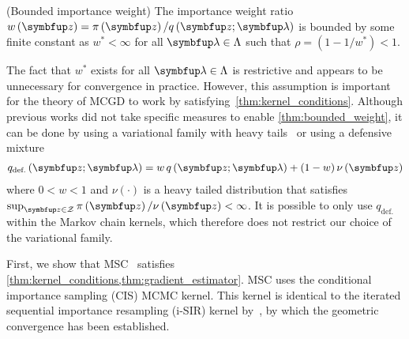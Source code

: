 \begin{assumption}{(Bounded importance weight)}\label{thm:bounded_weight}
  The importance weight ratio \(w\left(\vz\right) = \pi\left(\vz\right) / q\left(\vz; \vlambda\right)\) is bounded by some finite constant as \(w^* < \infty\) for all \(\vlambda \in \Lambda\) such that \(\rho = \left(1 - 1/w^*\right) < 1\).
\end{assumption}
The fact that \(w^*\) exists for all \(\vlambda \in \Lambda\) is restrictive and appears to be unnecessary for convergence in practice.
However, this assumption is important for the theory of MCGD to work by satisfying~\cref{thm:kernel_conditions}.
Although previous works did not take specific measures to enable \cref{thm:bounded_weight}, it can be done by using a variational family with heavy tails~\citep{NEURIPS2018_25db67c5} or using a defensive mixture~\citep{hesterberg_weighted_1995, holden_adaptive_2009} 
\begin{align*}
  q_{\text{def.}}\left(\vz; \vlambda \right) = w \, q\left(\vz; \vlambda\right) + (1 - w) \, \nu\left(\vz\right)
\end{align*}
where \(0 < w < 1\) and \(\nu\left(\cdot\right)\) is a heavy tailed distribution that satisfies \(\sup_{\vz \in \mathcal{Z}} \pi\left(\vz\right) / \nu\left(\vz\right) < \infty\).
It is possible to only use \(q_{\text{def.}}\) within the Markov chain kernels, which therefore does not restrict our choice of the variational family.

First, we show that MSC~\citep{NEURIPS2020_b2070693} satisfies \cref{thm:kernel_conditions,thm:gradient_estimator}.
MSC uses the conditional importance sampling (CIS) MCMC kernel.
This kernel is identical to the iterated sequential importance resampling (i-SIR) kernel by~\citet{andrieu_uniform_2018}, by which the geometric convergence has been established.




